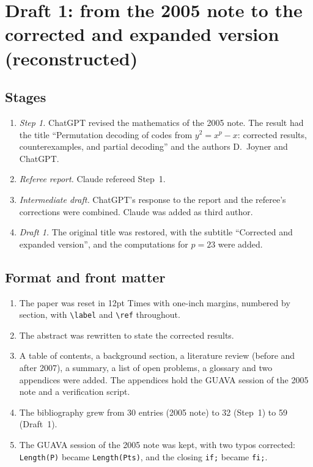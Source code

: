 \documentclass[12pt,letterpaper]{article}
\begin{document}
\section{Draft 1: from the 2005 note to the corrected and expanded version
(reconstructed)}\label{sec:draft1}

\subsection{Stages}
\begin{enumerate}
\item \emph{Step 1.} ChatGPT revised the mathematics of the 2005 note. The result
had the title ``Permutation decoding of codes from $y^2=x^p-x$: corrected results,
counterexamples, and partial decoding'' and the authors D.~Joyner and ChatGPT.
\item \emph{Referee report.} Claude refereed Step~1.
\item \emph{Intermediate draft.} ChatGPT's response to the report and the
referee's corrections were combined. Claude was added as third author.
\item \emph{Draft 1.} The original title was restored, with the subtitle
``Corrected and expanded version'', and the computations for $p=23$ were added.
\end{enumerate}

\subsection{Format and front matter}
\begin{enumerate}
\item The paper was reset in 12pt Times with one-inch margins, numbered by
section, with \verb|\label| and \verb|\ref| throughout.
\item The abstract was rewritten to state the corrected results.
\item A table of contents, a background section, a literature review (before and
after 2007), a summary, a list of open problems, a glossary and two appendices
were added. The appendices hold the GUAVA session of the 2005 note and a
verification script.
\item The bibliography grew from 30 entries (2005 note) to 32 (Step~1) to 59
(Draft~1).
\item The GUAVA session of the 2005 note was kept, with two typos corrected:
\texttt{Length(P)} became \texttt{Length(Pts)}, and the closing \texttt{if;} became
\texttt{fi;}.
\end{enumerate}
\end{document}
